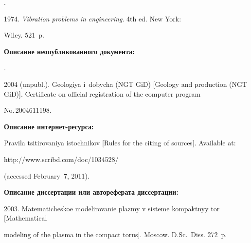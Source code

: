 {\begin{enumerate}[1.]
{\begin{enumerate}[1.]
.


1974. \textit{Vibration problems in engineering}. 4th ed. New York: 


Wiley. 521~p.


\end{enumerate}





\vspace*{-3pt}








\noindent


\textbf{Описание неопубликованного документа:}








.


2004 (unpubl.). Geologiya i~dobycha (NGT GiD) [Geology and production (NGT GiD)]. Certificate on official registration of the computer program


No.\,2004611198. 





\noindent


\textbf{Описание интернет-ресурса:}








Pravila tsitirovaniya istochnikov [Rules for the citing of sources]. Available at: {\sf


http://www.scribd.com/doc/1034528/} (accessed February~7, 2011).










\noindent


\textbf{Описание диссертации или автореферата диссертации:}







2003. Matematicheskoe modelirovanie plazmy v sisteme kompaktnyy tor [Mathematical


modeling of the plasma in the compact torus].  Moscow.  D.Sc.\ Diss. 272~p.





}
\end{enumerate}}
